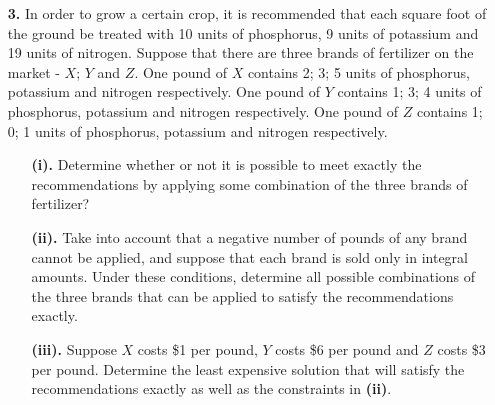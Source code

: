\documentclass[ 12pt ]{article}
\begin{document}
\begin{enumerate}
	\item[\textbf{3.}] In order to grow a certain crop, it is recommended that each square foot of the ground be treated with 10 units of phosphorus, 9 units of potassium
		and 19 units of nitrogen. Suppose that there are three brands of fertilizer on the market - $X$; $Y$ and $Z$. One pound of $X$ contains 2; 3; 5 units of phosphorus,
		potassium and nitrogen respectively. One pound of $Y$ contains 1; 3; 4 units of phosphorus, potassium and nitrogen respectively. One pound of $Z$ contains 1; 0; 1
		units of phosphorus, potassium and nitrogen respectively.
		\begin{enumerate}
			\item[\textbf{(i).}] Determine whether or not it is possible to meet exactly the recommendations by applying some combination of the three brands of fertilizer?
			\item[\textbf{(ii).}] Take into account that a negative number of pounds of any brand cannot be applied, and suppose that each brand is sold only in integral
				amounts. Under these conditions, determine all possible combinations of the three brands that can be applied to satisfy the recommendations exactly.
			\item[\textbf{(iii).}] Suppose $X$ costs \$1 per pound, $Y$ costs \$6 per pound and $Z$ costs \$3 per pound. Determine the least expensive solution that will
				satisfy the recommendations exactly as well as the constraints in \textbf{(ii)}.
		\end{enumerate}


\end{enumerate}
\end{document}
